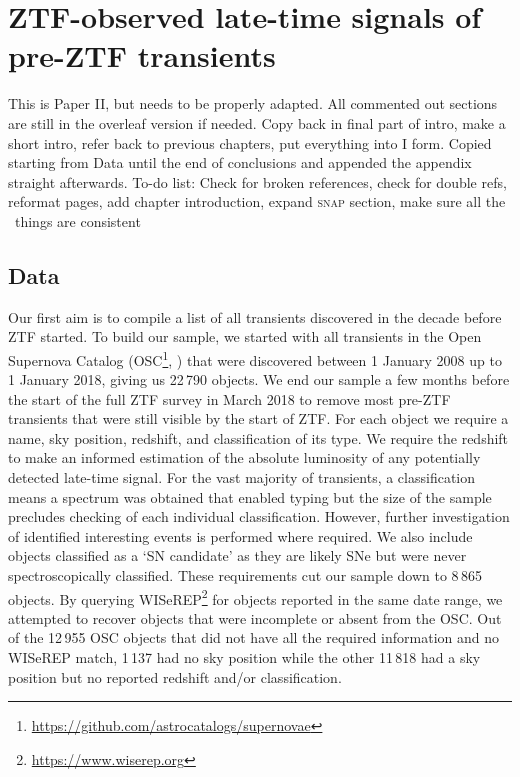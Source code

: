 \documentclass[a4paper,oneside,12pt, class=Latex/Classes/PhDthesisPSnPDF, crop=false]{standalone}
\begin{document}
\doublespacing
\chapter{ZTF-observed late-time signals of pre-ZTF transients}
\label{chap:pre-ZTF_search}


\color{red} This is Paper II, but needs to be properly adapted. All commented out sections are still in the overleaf version if needed. Copy back in final part of intro, make a short intro, refer back to previous chapters, put everything into I form. Copied starting from Data until the end of conclusions and appended the appendix straight afterwards. To-do list: Check for broken references, check for double refs, reformat pages, add chapter introduction, expand \textsc{snap} section, make sure all the \ztfg\ztfr\ztfi\ things are consistent\color{black}


\section{Data}
\label{data}
Our first aim is to compile a list of all transients discovered in the decade before ZTF started. To build our sample, we started with all transients in the Open Supernova Catalog (OSC\footnote{\url{https://github.com/astrocatalogs/supernovae}}, \citealt{Open_SN_cat}) that were discovered between 1 January 2008 up to 1 January 2018, giving us 22\,790 objects. We end our sample a few months before the start of the full ZTF survey in March 2018 to remove most pre-ZTF transients that were still visible by the start of ZTF. For each object we require a name, sky position, redshift, and classification of its type. We require the redshift to make an informed estimation of the absolute luminosity of any potentially detected late-time signal. For the vast majority of transients, a classification means a spectrum was obtained that enabled typing but the size of the sample precludes checking of each individual classification. However, further investigation of identified interesting events is performed where required. We also include objects classified as a `SN candidate' as they are likely SNe but were never spectroscopically classified. These requirements cut our sample down to 8\,865 objects. By querying WISeREP\footnote{\url{https://www.wiserep.org}} \citep{wiserep} for objects reported in the same date range, we attempted to recover objects that were incomplete or absent from the OSC. Out of the 12\,955 OSC objects that did not have all the required information and no WISeREP match, 1\,137 had no sky position while the other 11\,818 had a sky position but no reported redshift and/or classification.
\end{document}
